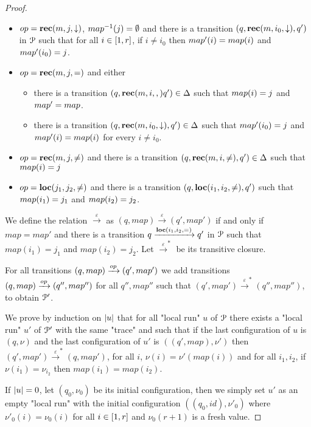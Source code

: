 \begin{proof}
\begin{itemize}
		\item $\op=\rec{m}{j}{\enregact}$, $\map^{-1}(j) =\emptyset$ and there is a transition $(q, \textbf{rec}(m, i_0, \downarrow), q')$ in $\mathcal{P}$ such that for all $i \in [1,r]$, if $i \ne i_0$ then $\map'(i) = \map(i)$ and $\map'(i_0) = j$.
		
		\item $\op = \rec{m}{j}{\eqtestact}$ and either
		\begin{itemize}
			\item there is a transition $(q, \textbf{rec}(m, i, ,) q') \in \Delta$ such that $\map(i)=j$ and $\map'=\map$.
			
			\item there is a transition $(q, \textbf{rec}(m, i_0, \downarrow), q') \in \Delta$ such that $\map'(i_0)=j$ and $\map'(i) = \map(i)$ for every $i \neq i_0$.
		\end{itemize} 
		
		\item $\op = \rec{m}{j}{\diseqtestact}$ and there is a transition $(q, \textbf{rec}(m, i, {\ne}), q') \in \Delta$ such that $\map(i)=j$
		
		\item $\op=\loc{j_1}{j_2}{\diseqtestact}$ and there is a transition $(q, \textbf{loc}(i_1,i_2,{\ne}), q')$ such that $\map(i_1)=j_1$ and $\map(i_2) = j_2$.
	\end{itemize}
	
	
	We define the relation $\xrightarrow{\varepsilon}$ as $(q, map) \xrightarrow{\varepsilon} (q', map')$ if and only if $map=map'$ and there is a transition $q \xrightarrow{\textbf{loc}(i_1,i_2,{=})} q'$ in $\mathcal{P}$ such that $map(i_1)=j_1$ and $map(i_2) = j_2$.
	Let $\xrightarrow{\varepsilon}^*$ be its transitive closure.
	
	For all transitions $(q,map) \xrightarrow{\op} (q', map')$ we add transitions $(q,map) \xrightarrow{\op} (q'', map'')$ for all $q'', map''$ such that $(q', map') \xrightarrow{\varepsilon}^* (q'', map'')$, to obtain $\mathcal{P}'$.
	
	We prove by induction on $|u|$ that for all "local run" $u$ of $\mathcal{P}$ there exists a "local run" $u'$ of $\mathcal{P}'$ with the same "trace" and such that if the last configuration of $u$ is $(q,\nu)$ and the last configuration of $u'$ is $((q',map), \nu')$ then $(q', map') \xrightarrow{\varepsilon}^* (q, map')$, for all $i$, $\nu(i) = \nu'(map(i))$ and for all $i_1, i_2$, if $\nu(i_1)=\nu_{i_2}$ then $map(i_1) = map(i_2)$.  
	
	If $|u| = 0$, let $(q_0, \nu_0)$ be its initial configuration, then we simply set $u'$ as an empty "local run" with the initial configuration $((q_0, id), \nu'_0)$ where $\nu'_0(i) = \nu_0(i)$ for all $i \in [1,r]$ and $\nu_0(r+1)$ is a fresh value.
	

\end{proof}
